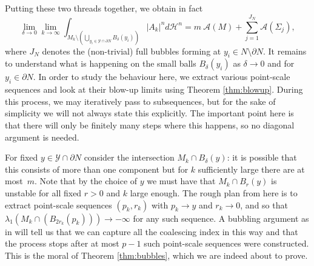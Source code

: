 \documentclass[10pt]{amsart}
\let\mathcal\mathscr
\theoremstyle{definition}
\newcommand{\h}{\mathscr{H}}
\begin{document}
Putting these two threads together, we obtain in fact
\begin{equation}\label{eq.mainlimit}
\lim_{\delta\to 0}\lim_{k\to\infty}\int_{M_k\setminus \left(\bigcup_{y_i \in \mathcal{Y}\cap \partial N} B_{\delta}(y_i)\right)} |A_k|^n d \h^n = m\ \mathcal{A}(M)+ \sum_{j=1}^{J_N} \mathcal{A}(\Sigma_j),
\end{equation}
where $J_N$ denotes the (non-trivial) full bubbles forming at $y_i\in N\setminus\partial N$.
It remains to understand what is happening on the small balls $B_\delta (y_i)$ as $\delta \to 0$ and for $y_i\in \partial N$. In order to study the behaviour here, we extract various point-scale sequences and look at their blow-up limits using Theorem \ref{thm:blowup}. During this process, we may iteratively pass to subsequences, but for the sake of simplicity we will not always state this explicitly. The important point here is that there will only be finitely many steps where this happens, so no diagonal argument is needed. 

For fixed $y\in \mathcal{Y}\cap \partial N$ consider the intersection $M_k\cap B_\delta(y)$: it is possible that this consists of more than one component but for $k$ sufficiently large there are at most~$m$. Note that by the choice of $y$ we must have that $M_k \cap B_{r}(y)$ is unstable for all fixed $r>0$ and $k$ large enough. The rough plan from here is to extract point-scale sequences $(p_k, r_k)$ with $p_k\to y$ and $r_k\to 0$, and so that $\lambda_1(M_k \cap (B_{2r_k}(p_k)))\to -\infty$ for any such sequence. A bubbling argument as in \cite{BS17} will tell us that we can capture all the coalescing index in this way and that the process stops after at most $p-1$ such point-scale sequences were constructed.
This is the moral of Theorem \ref{thm:bubbles}, which we are indeed about to prove.
\end{document}
